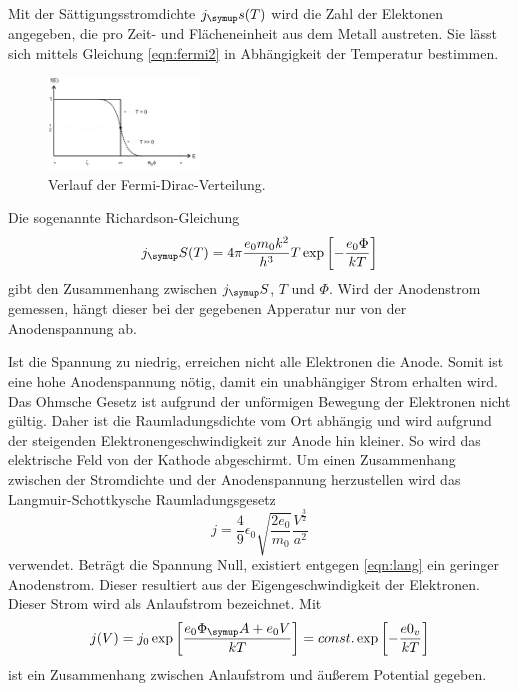 Mit der Sättigungsstromdichte $j_\su{s(T)}$ wird die Zahl der Elektonen angegeben,
die pro Zeit- und Flächeneinheit aus dem Metall austreten. Sie lässt sich mittels
Gleichung \eqref{eqn:fermi2} in Abhängigkeit der Temperatur bestimmen.

\begin{figure}
  \includegraphics[width = 4cm]{bilder/dirac.jpg}
  \caption{Verlauf der Fermi-Dirac-Verteilung.\cite{504}}
  \label{dirac}
\end{figure}
Die sogenannte Richardson-Gleichung
\begin{equation*}
  j_\su{S}(T) = 4\pi\frac{e_0 m_0 k^2}{h^3}T\exp\left[-\frac{e_0\Phi}{kT}\right]
  \label{eqn:richard}
\end{equation*}
gibt den Zusammenhang zwischen $j_\su{S}$, $T$ und $\Phi$. Wird der Anodenstrom
gemessen, hängt dieser bei der gegebenen Apperatur nur von der Anodenspannung ab.

Ist die Spannung zu niedrig, erreichen nicht alle Elektronen die Anode. Somit ist
eine hohe Anodenspannung nötig, damit ein unabhängiger Strom erhalten wird.
Das Ohmsche Gesetz ist aufgrund der unförmigen Bewegung der Elektronen nicht
gültig. Daher ist die Raumladungsdichte vom Ort abhängig und wird aufgrund der
steigenden Elektronengeschwindigkeit zur Anode hin kleiner. So wird das elektrische
Feld von der Kathode abgeschirmt.
Um einen Zusammenhang zwischen der Stromdichte und der Anodenspannung herzustellen
wird das Langmuir-Schottkysche Raumladungsgesetz
\begin{equation}
  j = \frac{4}{9}\epsilon_0\sqrt{\frac{2e_0}{m_0}}\frac{V^{\frac{3}{2}}}{a^2}
  \label{eqn:lang}
\end{equation}
verwendet.
Beträgt die Spannung Null, existiert entgegen \eqref{eqn:lang} ein geringer
Anodenstrom. Dieser resultiert aus der Eigengeschwindigkeit der Elektronen. Dieser
Strom wird als Anlaufstrom bezeichnet.
Mit
\begin{equation}
  j(V) = j_0\exp\left[\frac{e_0\Phi_\su{A}+e_0 V}{kT}\right] = const. \exp\left[-\frac
  {e0_v}{kT}\right]
  \label{eqn:T}
\end{equation}
ist ein Zusammenhang zwischen Anlaufstrom und äußerem Potential gegeben.

